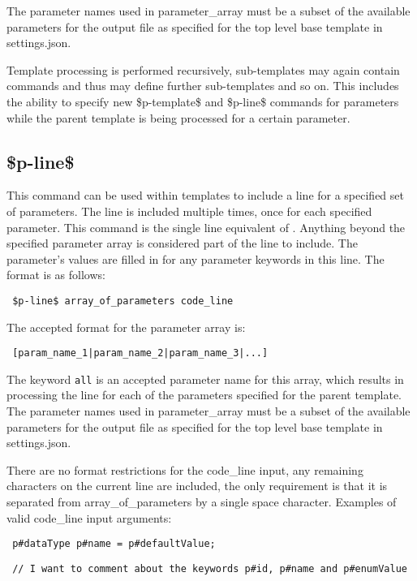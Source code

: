 \documentclass{settings/TU_Delft_Report}
\begin{document}
The parameter names used in parameter\_array must be a subset of the available parameters for the output file as specified for the top level base template in settings.json.

Template processing is performed recursively, sub-templates may again contain commands and thus may define further sub-templates and so on. This includes the ability to specify new \$p-template\$ and \$p-line\$ commands for parameters while the parent template is being processed for a certain parameter.

\subsection{\$p-line\$} \label{p-line}
This command can be used within templates to include a line for a specified set of parameters. The line is included multiple times, once for each specified parameter. This command is the single line equivalent of . Anything beyond the specified parameter array is considered part of the line to include. The parameter's values are filled in for any parameter keywords in this line. The format is as follows:
\begin{lstlisting}
 $p-line$ array_of_parameters code_line
\end{lstlisting}
The accepted format for the parameter array is:
\begin{lstlisting}
 [param_name_1|param_name_2|param_name_3|...]
\end{lstlisting}
The keyword \lstinline{all} is an accepted parameter name for this array, which results in processing the line for each of the parameters specified for the parent template.\\

The parameter names used in parameter\_array must be a subset of the available parameters for the output file as specified for the top level base template in settings.json.

There are no format restrictions for the code\_line input, any remaining characters on the current line are included, the only requirement is that it is separated from array\_of\_parameters by a single space character. Examples of valid code\_line input arguments:
\begin{lstlisting}
 p#dataType p#name = p#defaultValue;
\end{lstlisting}

\begin{lstlisting}
 // I want to comment about the keywords p#id, p#name and p#enumValue
\end{lstlisting}
\end{document}
